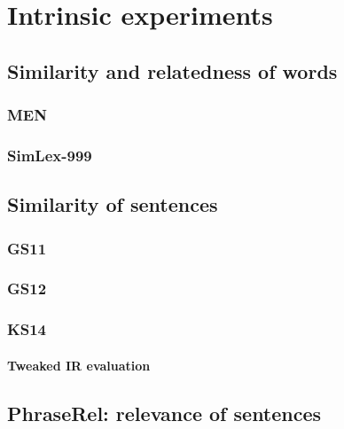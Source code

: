 
\chapter{Intrinsic experiments}
\label{cha:experiments}

\section{Similarity and relatedness of words}
\label{sec:lexical}

\subsection{MEN}
\label{sec:men}

\subsection{SimLex-999}
\label{sec:simlex-999}

\section{Similarity of sentences}
\label{sec:sentential}

\subsection{GS11}
\label{sec:gs11}

\subsection{GS12}
\label{sec:gs12}

\subsection{KS14}
\label{sec:ks14}

\subsubsection{Tweaked IR evaluation}
\label{sec:tweak-ir-eval}


\section{PhraseRel: relevance of sentences}
\label{sec:sentential-relevance}

